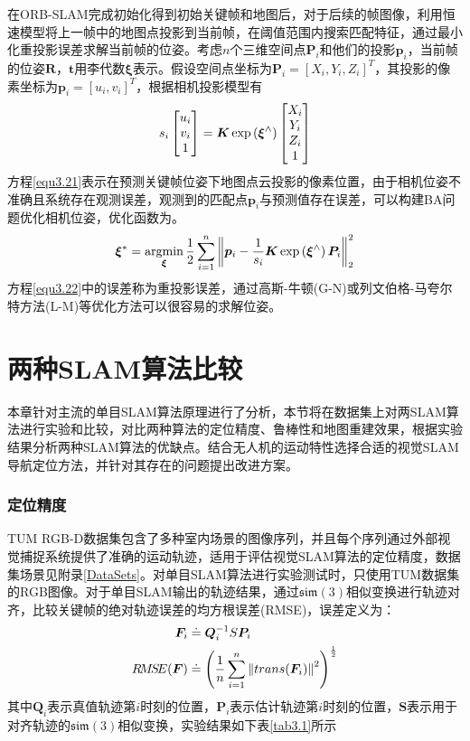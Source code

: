 在ORB-SLAM完成初始化得到初始关键帧和地图后，对于后续的帧图像，利用恒速模型将上一帧中的地图点投影到当前帧，在阈值范围内搜索匹配特征，通过最小化重投影误差求解当前帧的位姿。考虑$n$个三维空间点$\boldsymbol{P}_i$和他们的投影$\boldsymbol{p}_i$，当前帧的位姿$\boldsymbol{R}$，$\boldsymbol{t}$用李代数$\boldsymbol{\xi}$表示。假设空间点坐标为$\boldsymbol{P}_i=[X_i,Y_i,Z_i]^T$，其投影的像素坐标为$\boldsymbol{p}_i = [u_i,v_i]^T$，根据相机投影模型有
\begin{equation}
\label{equ3.21}
s_i
\begin{bmatrix}
u_i \cr v_i \cr 1\cr 
\end{bmatrix}
=
\boldsymbol{K} \exp\left( \boldsymbol{\xi}^{\wedge} \right)
\begin{bmatrix}
X_i \cr Y_i \cr Z_i \cr 1 \cr
\end{bmatrix}
\end{equation}
方程\eqref{equ3.21}表示在预测关键帧位姿下地图点云投影的像素位置，由于相机位姿不准确且系统存在观测误差，观测到的匹配点$\boldsymbol{p}_i$与预测值存在误差，可以构建BA问题优化相机位姿，优化函数为。
\begin{equation}
\label{equ3.22}
\boldsymbol{\xi}^* = \operatorname*{argmin}\limits_{\boldsymbol{\xi}} {1 \over 2} \sum\limits_{i=1}^n  \left \Vert \boldsymbol{p}_i - {1 \over s_i} \boldsymbol{K} \exp\left( \boldsymbol{\xi}^{\wedge} \right) \boldsymbol{P}_i  \right \Vert_2^2
\end{equation}
方程\eqref{equ3.22}中的误差称为重投影误差，通过高斯-牛顿(G-N)或列文伯格-马夸尔特方法(L-M)等优化方法可以很容易的求解位姿。

\section{两种SLAM算法比较}
本章针对主流的单目SLAM算法原理进行了分析，本节将在数据集上对两SLAM算法进行实验和比较，对比两种算法的定位精度、鲁棒性和地图重建效果，根据实验结果分析两种SLAM算法的优缺点。结合无人机的运动特性选择合适的视觉SLAM导航定位方法，并针对其存在的问题提出改进方案。

\subsubsection{定位精度}
TUM RGB-D数据集\upcite{[3.12]}包含了多种室内场景的图像序列，并且每个序列通过外部视觉捕捉系统提供了准确的运动轨迹，适用于评估视觉SLAM算法的定位精度，数据集场景见附录\ref{DataSets}。对单目SLAM算法进行实验测试时，只使用TUM数据集的RGB图像。对于单目SLAM输出的轨迹结果，通过$\mathfrak{sim}(3)$相似变换进行轨迹对齐，比较关键帧的绝对轨迹误差的均方根误差(RMSE)，误差定义为：
\begin{equation}
\label{equ3.23}
\begin{aligned}
\boldsymbol{F}_i &\doteq \boldsymbol{Q}_i^{-1} S \boldsymbol{P}_i
\\ 
R\!M\!S\!E(\boldsymbol{F}) &\doteq \left( {1 \over n} \sum\limits_{i=1}^n \left \Vert trans(\boldsymbol{F}_i) \right \Vert^2 \right)^{1 \over 2} 
\end{aligned}
\end{equation}
其中$\boldsymbol{Q}_i$表示真值轨迹第$i$时刻的位置，$\boldsymbol{P}_i$表示估计轨迹第$i$时刻的位置，$\boldsymbol{S}$表示用于对齐轨迹的$\mathfrak{sim}(3)$相似变换，实验结果如下表\ref{tab3.1}所示

